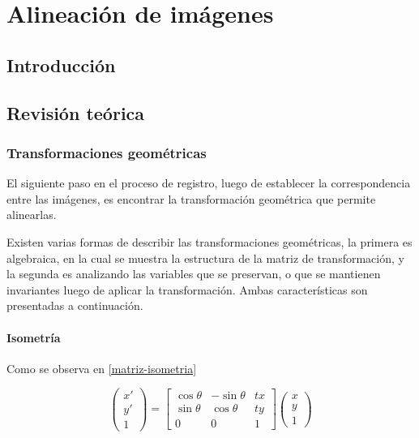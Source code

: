 \chapter{Alineación de imágenes}
\label{capitulo4}

\section{Introducción}



\section{Revisión teórica}
\subsection{Transformaciones geométricas}

El siguiente paso en el proceso de registro, luego de establecer la correspondencia entre las imágenes, es encontrar la transformación geométrica que permite alinearlas.

Existen varias formas de describir las transformaciones geométricas, la primera es algebraica, en la cual se muestra la estructura de la matriz de transformación, y la segunda es analizando las variables que se preservan, o que se mantienen invariantes luego de aplicar la transformación. Ambas características son presentadas a continuación.

\subsubsection*{Isometría}

Como se observa en \ref{matriz-isometria}

\begin{equation}
	\begin{pmatrix}
	{x'}\\{y'}\\{1}
	\end{pmatrix} = 
	\begin{bmatrix}
	{\cos \theta}&{-\sin \theta}&{tx}\\
	{\sin \theta}&{\cos \theta}&{ty}\\
	{0}&{0}&{1}
	\end{bmatrix}
	\begin{pmatrix}
	{x}\\{y}\\{1}
	\end{pmatrix}
	\label{matriz-isometria}
\end{equation}

